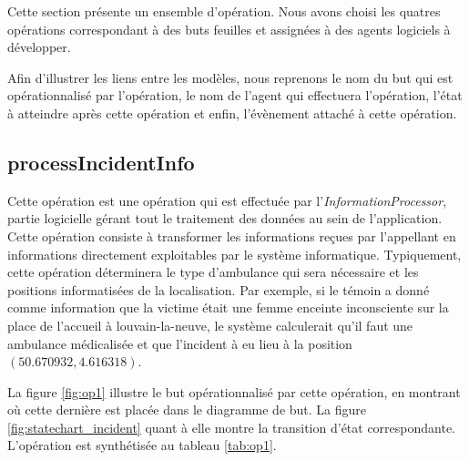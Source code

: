 Cette section présente un ensemble d'opération. Nous avons choisi les quatres
opérations correspondant à des buts feuilles et assignées à des agents logiciels
à développer.

Afin d'illustrer les liens entre les modèles, nous reprenons le nom du but
qui est opérationnalisé par l'opération, le nom de l'agent qui effectuera 
l'opération, l'état à atteindre après cette opération et enfin, l'évènement
attaché à cette opération.

\subsection{processIncidentInfo}

	Cette opération est une opération qui est effectuée par l'\textit{InformationProcessor},
	partie logicielle gérant tout le traitement des données au sein de
	l'application. Cette opération consiste à transformer les informations
	reçues par l'appellant en informations directement exploitables par le
	système informatique. Typiquement, cette opération déterminera 
	le type d'ambulance qui sera nécessaire et les positions \og informatisées \fg
	de la localisation. Par exemple, si le témoin a donné comme information
	que la victime était une femme enceinte inconsciente sur la place de l'accueil
	à louvain-la-neuve, le système calculerait qu'il faut une ambulance
	médicalisée et que l'incident à eu lieu à la position $(50.670932,4.616318)$.
	
	La figure \ref{fig:op1} illustre le but opérationnalisé par cette opération,
	en montrant où cette dernière est placée dans le diagramme de but. La figure
	\ref{fig:statechart_incident} quant à elle montre la transition d'état 
	correspondante. L'opération est synthétisée au tableau \ref{tab:op1}.
	
	
